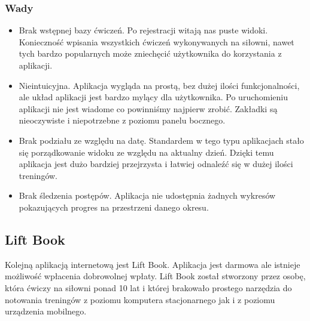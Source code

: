 \documentclass{article}
\begin{document}
            \subsubsection*{Wady}
            \begin{itemize}
                  \item Brak wstępnej bazy ćwiczeń. Po rejestracji witają nas puste widoki. Konieczność wpisania wszystkich ćwiczeń wykonywanych na siłowni, nawet tych bardzo popularnych może zniechęcić użytkownika do korzystania z aplikacji.
                  \item Nieintuicyjna. Aplikacja wygląda na prostą, bez dużej ilości funkcjonalności, ale układ aplikacji jest bardzo mylący dla użytkownika. Po uruchomieniu aplikacji nie jest wiadome co powinniśmy najpierw zrobić. Zakładki są nieoczywiste i niepotrzebne z poziomu panelu bocznego.
                  \item Brak podziału ze względu na datę. Standardem w tego typu aplikacjach stało się porządkowanie widoku ze względu na aktualny dzień. Dzięki temu aplikacja jest dużo bardziej przejrzysta i łatwiej odnaleźć się w dużej ilości treningów.
                  \item Brak śledzenia postępów. Aplikacja nie udostępnia żadnych wykresów pokazujących progres na przestrzeni danego okresu.
            \end{itemize}
      \subsection{Lift Book}
            Kolejną aplikacją internetową jest Lift Book. Aplikacja jest darmowa ale istnieje możliwość wpłacenia dobrowolnej wpłaty. Lift Book został stworzony przez osobę, która ćwiczy na siłowni ponad 10 lat i której brakowało prostego narzędzia do notowania treningów z poziomu komputera stacjonarnego jak i z poziomu urządzenia mobilnego.
\end{document}
